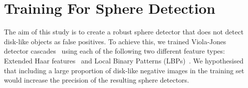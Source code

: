 \documentclass{sig-alternate-05-2015}
\newcommand{\tmpcomment}[1]{}
\newcommand{\citep}[1]{\cite{#1}}
\begin{document}
	\section{Training For Sphere Detection} {

		The aim of this study is to create a robust sphere detector that does not detect disk-like objects as false positives. To achieve this, we trained Viola-Jones detector cascades~\citep{viola2001rapid} using each of the following two different feature types: Extended Haar features~\citep{Lienhart2002extended}\tmpcomment{, Histograms of Oriented Gradients (HoG) features~\citep{dalal2005histograms},} and Local Binary Patterns (LBPs)~\citep{liao2007learning}. We hypothesised that including a large proportion of disk-like negative images in the training set would increase the precision of the resulting sphere detectors.



	}
\end{document}
